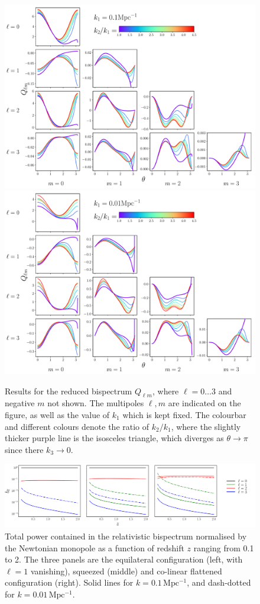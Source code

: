 {\clearpage
\begin{figure}[ht]
	\centering
	\includegraphics[width=0.85\linewidth]{fig/redB_k01.pdf}
	\includegraphics[width=0.85\linewidth]{fig/redB_k001.pdf}
	\caption{Results for the reduced bispectrum \(Q_{\ell m}\), where \(\ell = 0 \ldots 3\) and negative \(m\) not shown. The multipoles \(\ell,m\) are indicated on the figure, as well as the value of \(k_1\) which is kept fixed. The colourbar and different colours denote the ratio of \(k_2/k_1\), where the slightly thicker purple line is the isosceles triangle, which diverges as \(\theta\to\pi\) since there \(k_3\to 0\). \label{fig:Q_rb}}
\end{figure}

\clearpage
\begin{figure}[ht]
\centering
\includegraphics[width=\linewidth]{fig/fnofz.pdf}
\caption{Total power contained in the relativistic bispectrum normalised by the Newtonian monopole as a function of redshift \(z\) ranging from 0.1 to 2. The three panels are the equilateral configuration (left, with \(\ell = 1\) vanishing), squeezed (middle) and co-linear flattened configuration (right). Solid lines for \(k = 0.1 \, \mathrm{Mpc^{-1}}\), and dash-dotted for \(k = 0.01 \, \mathrm{Mpc^{-1}}\).\label{fig:fnofz}}
\end{figure}

}
